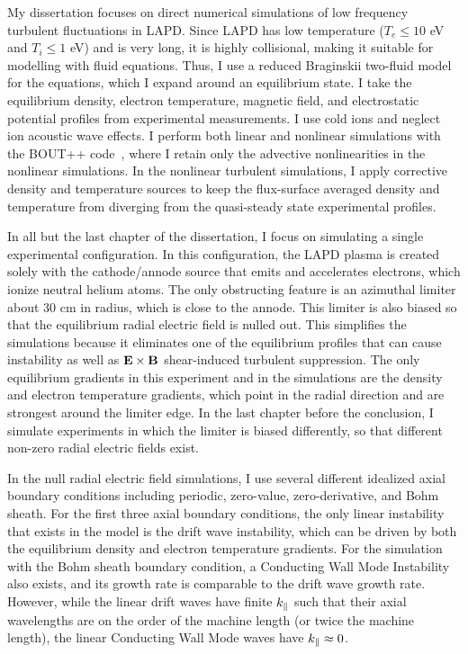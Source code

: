 My dissertation focuses on direct numerical simulations of low frequency turbulent fluctuations in LAPD. Since LAPD has low temperature ($T_e \le 10$ eV and $T_i \le 1$ eV) and is very long,
it is highly collisional, making it suitable for modelling with fluid equations. Thus, I use a reduced Braginskii two-fluid model~\cite{Braginskii1965} for the equations, which I expand around
an equilibrium state. I take the equilibrium density, electron temperature, magnetic field, and electrostatic potential profiles from experimental measurements. I use cold ions and neglect ion acoustic
wave effects. I perform both linear and nonlinear simulations with the BOUT++ code~\cite{dudson2009}, where I retain only the advective nonlinearities in the nonlinear simulations.
In the nonlinear turbulent simulations, I apply corrective density and temperature sources to keep the flux-surface averaged density and temperature from diverging from the quasi-steady state
experimental profiles.

In all but the last chapter of the dissertation, I focus on simulating a single experimental configuration. In this configuration, the LAPD plasma is created solely with the cathode/annode
source that emits and accelerates electrons, which ionize neutral helium atoms. The only obstructing feature is an azimuthal limiter about 30 cm in radius, which is close to the annode. 
This limiter is also biased so that the equilibrium radial electric field
is nulled out. This simplifies the simulations because it eliminates one of the equilibrium profiles that can cause instability as well as ${\bf E \times B}$ shear-induced turbulent suppression.
The only equilibrium gradients in this experiment and in the simulations are the density and electron temperature gradients, which point in the radial direction and are strongest around the limiter edge.
In the last chapter before the conclusion, I simulate experiments in which the limiter is biased differently, so that different non-zero radial electric fields exist.

In the null radial electric field simulations, I use several different idealized axial boundary conditions including periodic, zero-value, zero-derivative, and Bohm sheath. For the first three
axial boundary conditions, the only linear instability that exists in the model is the drift wave instability, which can be driven by both the equilibrium density and electron temperature gradients.
For the simulation with the Bohm sheath boundary condition, a Conducting Wall Mode Instability also exists, and its growth rate is comparable to the drift wave growth rate. However, while the linear
drift waves have finite $k_\parallel$ such that their axial wavelengths are on the order of the machine length (or twice the machine length), the linear Conducting Wall Mode waves have $k_\parallel \approx 0$.

